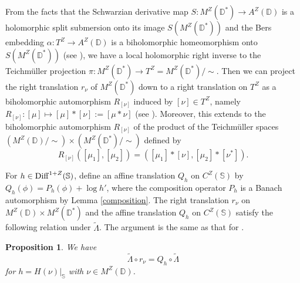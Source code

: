 \documentclass[amstex]{amsart}
\newtheorem{proposition}[theorem]{Proposition}
\theoremstyle{definition}
\theoremstyle{remark}
\numberwithin{equation}{section}
\begin{document}
From the facts that the Schwarzian derivative map $S:M^Z(\mathbb D^*) \to A^Z(\mathbb D)$ is a holomorphic split submersion
onto its image $S(M^Z(\mathbb D^*))$
and the Bers embedding $\alpha:T^Z \to A^Z(\mathbb D)$ is a biholomorphic homeo\-morphism onto $S(M^Z(\mathbb D^*))$
 (see \cite[Theorem 3]{M3}),
we have a local holomorphic right inverse to the Teichm\"uller projection 
$\pi:M^Z(\mathbb D^*) \to T^Z=M^Z(\mathbb D^*)/\sim$.
Then we can project the right translation $r_{\nu}$ of $M^Z(\mathbb D^*)$ down to a right translation on $T^Z$
as a biholomorphic automorphism $R_{[\nu]}$ induced by $[\nu] \in T^Z$, namely
$R_{[\nu]}:[\mu] \mapsto [\mu]\ast[\nu]:=[\mu \ast \nu]$ (see \cite[Remark 1]{M3}).
Moreover, this extends to the biholomorphic automorphism $R_{[\nu]}$ of 
the product of the Teichm\"uller spaces $(M^Z(\mathbb D)/\sim) \times (M^Z(\mathbb D^*)/\sim)$
defined by 
\begin{equation}\label{product}
R_{[\nu]}([\mu_1], [\mu_2]) = ([\mu_1] \ast [\nu], [\mu_2] \ast [\nu^*]).
\end{equation}

For $h \in {\rm Diff}^{1+Z}(\mathbb S)$, define an affine translation $Q_h$ on $C^Z(\mathbb S)$ 
by $Q_h(\phi) = P_h(\phi) + \log h'$, where the composition operator $P_h$ 
is a Banach automorphism by Lemma \ref{composition}.
The right translation $r_\nu$ on $M^Z(\mathbb D) \times M^Z(\mathbb D^*)$ and the affine translation $Q_h$ on $C^Z(\mathbb S)$ 
satisfy the following relation under $\widetilde \Lambda$. The argument is the same as that for \cite[Proposition 5.1]{WM-3}.

\begin{proposition}\label{translation}
We have
$$
\widetilde \Lambda \circ r_\nu = Q_h \circ \widetilde \Lambda
$$
for $h=H(\nu)|_{\mathbb S}$ with $\nu \in M^Z(\mathbb D)$.
\end{proposition}
\end{document}
